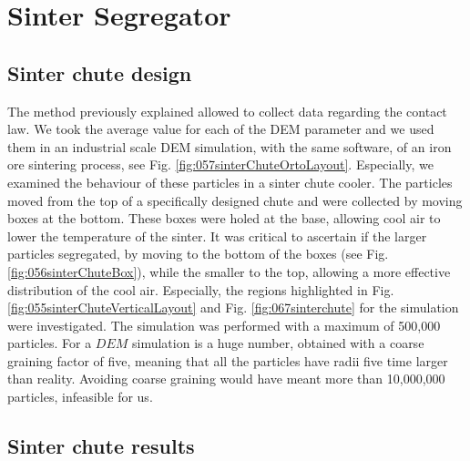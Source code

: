 
\chapter{Sinter Segregator}
\label{cap:sintersegregator}

\section{Sinter chute design}
\label{sec:sinterchutedesign}

The method previously explained allowed to collect data regarding the contact
law. We took the average value for each of the \acs{DEM} parameter and we used them 
in an industrial scale \acs{DEM} simulation, with the same software, 
of an iron ore sintering process, see Fig. \ref{fig:057sinterChuteOrtoLayout}.
Especially, we examined the behaviour of these particles in a sinter chute cooler. 
The particles moved from the top of a specifically designed chute and were 
collected by moving boxes at the bottom. These boxes were holed at the base, 
allowing cool air to lower the temperature of the sinter. 
It was critical to ascertain if the larger particles segregated, 
by moving to the bottom of the boxes (see Fig. \ref{fig:056sinterChuteBox}), while the smaller to the top,
allowing a more effective distribution of the cool air. 
Especially, the regions
highlighted in Fig. \ref{fig:055sinterChuteVerticalLayout} and
Fig. \ref{fig:067sinterchute} for the simulation were investigated.
The simulation was performed with a maximum of 500,000 particles.
For a $DEM$ simulation is a huge number, obtained with a coarse graining factor
of five, meaning that all the particles have radii five time larger than reality.
Avoiding coarse graining would have meant more than 10,000,000 particles,
infeasible for us.






\section{Sinter chute results}
\label{sec:sinterchuteresults}

